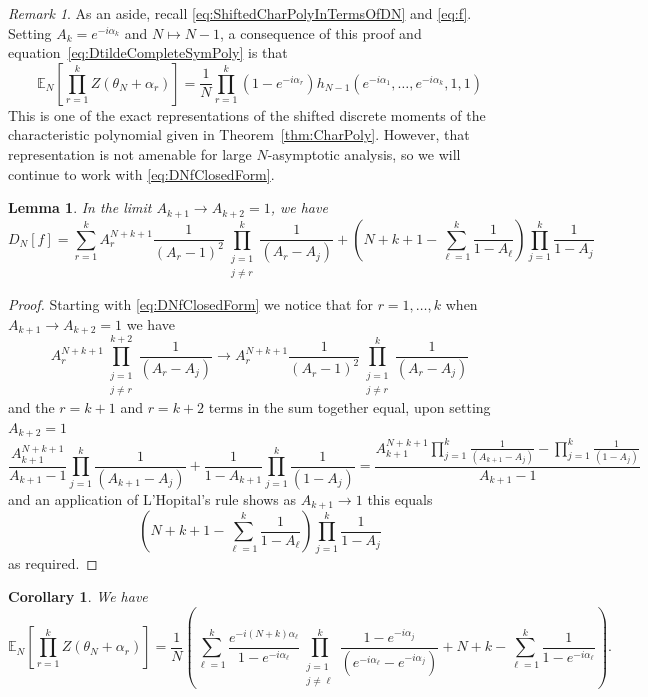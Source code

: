 \documentclass[12pt,a4paper,reqno]{amsart}
\newtheorem{corollary}{Corollary}
\newtheorem{lemma}{Lemma}
\theoremstyle{remark}
\newtheorem*{remark}{Remark}
\numberwithin{equation}{section}
\newcommand{\E}{\mathbb{E}}
\begin{document}
\begin{remark}
As an aside, recall \eqref{eq:ShiftedCharPolyInTermsOfDN} and \eqref{eq:f}. Setting $A_k = e^{-i\alpha_k}$ and $N \mapsto N-1$, a consequence of this proof and equation~\eqref{eq:DtildeCompleteSymPoly} is that
\[
\E_N\left[ \prod_{r=1}^k Z(\theta_N+\alpha_r) \right] =  \frac{1}{N}\prod_{r=1}^k \left(1-e^{-i\alpha_r}\right) h_{N-1}\left(e^{-i\alpha_1} , \dots, e^{-i\alpha_k} , 1,1 \right)
\]
This is one of the exact representations of the shifted discrete moments of the characteristic polynomial given in Theorem~\ref{thm:CharPoly}.
However, that representation is not amenable for large $N$-asymptotic analysis, so we will continue to work with \eqref{eq:DNfClosedForm}.
\end{remark}

\begin{lemma}
    In the limit $A_{k+1} \to A_{k+2} = 1$, we have
\begin{equation*}
D_N[f] = \sum_{r=1}^{k} A_r^{N+k+1} \frac{1}{(A_r-1)^2} \prod_{\substack{j=1 \\ j \neq r}}^{k} \frac{1}{(A_r - A_j)} + \left(N+k+1 - \sum_{\ell=1}^k \frac{1}{1-A_\ell} \right) \prod_{j=1}^k \frac{1}{1-A_j}
\end{equation*}
\end{lemma}

\begin{proof}
Starting with \eqref{eq:DNfClosedForm} we notice that for $r=1,\dots,k$ when $A_{k+1} \to A_{k+2} = 1$ we have
\[
 A_r^{N+k+1} \prod_{\substack{j=1 \\ j \neq r}}^{k+2} \frac{1}{(A_r - A_j)} \to  A_r^{N+k+1} \frac{1}{(A_r - 1)^2} \prod_{\substack{j=1 \\ j \neq r}}^{k} \frac{1}{(A_r - A_j)}
\]
and the $r=k+1$ and $r=k+2$ terms in the sum together equal, upon setting $A_{k+2}=1$
\begin{equation*}
 \frac{A_{k+1}^{N+k+1}}{A_{k+1}-1} \prod_{j=1}^{k} \frac{1}{(A_{k+1} - A_j)} + \frac{1}{1-A_{k+1}}\prod_{j=1}^{k} \frac{1}{(1 - A_j)} = \frac{ A_{k+1}^{N+k+1} \prod_{j=1}^{k} \frac{1}{(A_{k+1} - A_j)} - \prod_{j=1}^{k} \frac{1}{(1 - A_j)} }{A_{k+1}-1}
\end{equation*}
and an application of L'Hopital's rule shows as $A_{k+1} \to 1$ this equals
\[
\left(N+k+1 - \sum_{\ell=1}^k \frac{1}{1-A_\ell} \right) \prod_{j=1}^k \frac{1}{1-A_j}
\]
as required.
\end{proof}

\begin{corollary}\label{cor:shiftedMmtsExact}
    We have
\begin{equation*}
\E_N\left[ \prod_{r=1}^k Z(\theta_N+\alpha_r) \right]
= \frac{1}{N} \left(\sum_{\ell=1}^{k} \frac{e^{-i(N+k)\alpha_\ell} }{1-e^{-i\alpha_\ell}} \prod_{\substack{j=1 \\ j \neq \ell}}^{k} \frac{1-e^{-i\alpha_j}}{(e^{-i\alpha_\ell} - e^{-i\alpha_j})} + N+k - \sum_{\ell=1}^k \frac{1}{1-e^{-i\alpha_\ell}} \right).
\end{equation*}
\end{corollary}
\end{document}
